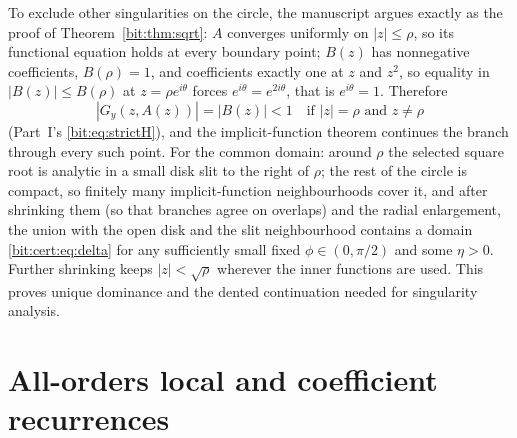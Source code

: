 \documentclass[11pt]{article}
\theoremstyle{definition}\newtheorem{definition}[theorem]{Definition}
\theoremstyle{remark}\newtheorem{remark}[theorem]{Remark}
\begin{document}
To exclude other singularities on the circle, the manuscript argues exactly
as the proof of Theorem~\ref{bit:thm:sqrt}: $A$ converges uniformly on
$|z|\le\rho$, so its functional equation holds at every boundary point; $B(z)$
has nonnegative coefficients, $B(\rho)=1$, and coefficients exactly one at $z$
and $z^2$, so equality in $|B(z)|\le B(\rho)$ at $z=\rho e^{i\theta}$ forces
$e^{i\theta}=e^{2i\theta}$, that is $e^{i\theta}=1$. Therefore
\begin{equation}\label{bit:cert:eq:boundary}
 |G_y(z,A(z))|=|B(z)|<1
 \quad\text{if }|z|=\rho\text{ and }z\ne\rho
\end{equation}
(Part~I's \eqref{bit:eq:strictH}), and the implicit-function theorem continues
the branch through every such point. For the common domain: around $\rho$ the
selected square root is analytic in a small disk slit to the right of $\rho$;
the rest of the circle is compact, so finitely many implicit-function
neighbourhoods cover it, and after shrinking them (so that branches agree on
overlaps) and the radial enlargement, the union with the open disk and the
slit neighbourhood contains a domain \eqref{bit:cert:eq:delta} for any
sufficiently small fixed $\phi\in(0,\pi/2)$ and some $\eta>0$. Further
shrinking keeps $|z|<\sqrt\rho$ wherever the inner functions are used. This
proves unique dominance and the dented continuation needed for singularity
analysis.

\section{All-orders local and coefficient recurrences}\label{bit:cert:sec:transfer}
\end{document}
